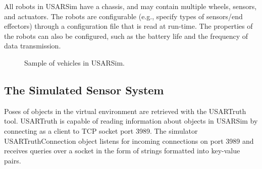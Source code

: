 All robots in USARSim have a chassis, and may contain multiple wheels, sensors, and
actuators. The robots are configurable (e.g., specify types of
sensors/end effectors) through a configuration file that is read at run-time. The properties of the robots can
also be configured, such as the battery life and the frequency of
data transmission.

\begin{figure}[t!]
\centering
{}\qquad
{}\qquad
{}\qquad
{}
\caption{Sample of vehicles in USARSim.}
\end{figure}

\subsection{The Simulated Sensor System}
\label{subsection:usartruth}
Poses of objects in the virtual environment are retrieved with the USARTruth tool. USARTruth is capable of reading information about objects in USARSim by connecting as a client to TCP socket port 3989. The simulator USARTruthConnection object listens for incoming connections on port 3989 and receives queries over a socket in the form of strings formatted into key-value pairs.

